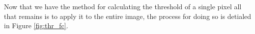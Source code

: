 Now that we have the method for calculating the threshold of a single pixel all that remains is to apply it to the entire image, the process for doing so is detialed in Figure \ref{fig:thr_fc}.


